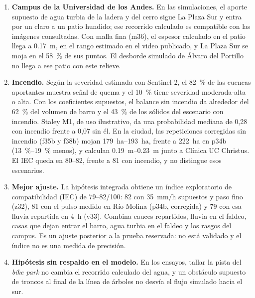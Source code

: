 \begin{enumerate}
\item \textbf{Campus de la Universidad de los Andes.} En las simulaciones, el aporte supuesto de agua turbia de la ladera y del cerro sigue La Plaza Sur y entra por un claro a un patio hundido; ese recorrido calculado es compatible con las imágenes consultadas. Con malla fina (m36), el espesor calculado en el patio llega a \SI{0,17}{m}, en el rango estimado en el video publicado, y La Plaza Sur se moja en el \SI{58}{\percent} de sus puntos. El desborde simulado de Álvaro del Portillo no llega a ese patio con este relieve.
\item \textbf{Incendio.} Según la severidad estimada con Sentinel-2, el \SI{82}{\percent} de las cuencas aportantes muestra señal de quema y el \SI{10}{\percent} tiene severidad moderada-alta o alta. Con los coeficientes supuestos, el balance sin incendio da alrededor del \SI{62}{\percent} del volumen de barro y el \SI{43}{\percent} de los sólidos del escenario con incendio. Staley M1, de uso ilustrativo, da una probabilidad mediana de 0,28 con incendio frente a 0,07 sin él. En la ciudad, las repeticiones corregidas sin incendio (f35b y f38b) mojan \SIrange{179}{193}{ha}, frente a \SI{222}{ha} en p34b (\SIrange{13}{19}{\percent} menos), y calculan \SIrange{0,19}{0,23}{m} junto a Clínica UC Christus. El IEC queda en 80--82, frente a 81 con incendio, y no distingue esos escenarios.
\item \textbf{Mejor ajuste.} La hipótesis integrada obtiene un índice exploratorio de compatibilidad (IEC) de 79--82/100: 82 con \SI{35}{mm/h} supuestos y paso fino (z32), 81 con el pulso medido en Río Molina (p34b, corregida) y 79 con esa lluvia repartida en \SI{4}{h} (v33). Combina cauces repartidos, lluvia en el faldeo, casas que dejan entrar el barro, agua turbia en el faldeo y los rasgos del campus. Es un ajuste posterior a la prueba reservada: no está validado y el índice no es una medida de precisión.
\item \textbf{Hipótesis sin respaldo en el modelo.} En los ensayos, tallar la pista del \emph{bike park} no cambia el recorrido calculado del agua, y un obstáculo supuesto de troncos al final de la línea de árboles no desvía el flujo simulado hacia el sur.
\end{enumerate}

